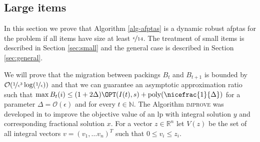 \subsection{Large items}
In this section we prove that Algorithm \ref{alg-afptas} is a dynamic robust \ac{afptas} for the \BP problem if all items have size at least $\nicefrac{\epsilon}{14}$. The treatment of small items is described in Section \ref{sec:small} and the general case is described in Section \ref{sec:general}. 

We will prove that the migration between packings $B_t$ and $B_{t+1}$ is bounded by $\mathcal{O}(\nicefrac{1}{\epsilon^3}\log(\nicefrac{1}{\epsilon}))$ and that we can guarantee an asymptotic approximation ratio such that $\max B_{t}(i) \leq (1+2\Delta) \OPT(I(t),s) + \text{poly}(\nicefrac{1}{\Delta})$ for a parameter $\Delta = \mathcal{O}(\epsilon)$ and for every $t \in \mathbb{N}$.
The Algorithm \textsc{improve} was developed in \cite{jansen2013binpacking} to improve the objective value of an \ac{lp} with integral solution $y$ and corresponding fractional solution $x$. For a vector $z \in \mathbb{R}^n$ let $V(z)$ be the set of all integral vectors $v = (v_1, \ldots v_n)^T$ such that $0 \leq  v_i \leq  z_i$.

